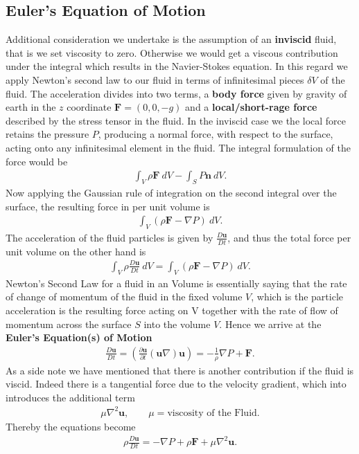 \subsection{Euler's Equation of Motion}
Additional consideration we undertake is the assumption of an
\textbf{inviscid} fluid, that is we set viscosity to zero. Otherwise we would
get a viscous contribution under the integral which results in the
Navier-Stokes equation. In this regard we apply Newton's second law to our
fluid in terms of infinitesimal pieces $\delta V$ of the fluid. The
acceleration divides into two terms, a \textbf{body force} given by gravity
of earth in the $z$ coordinate $\mathbf{F} = (0, 0, -g)$ and a
\textbf{local/short-rage force} described by the stress tensor in the fluid.
In the inviscid case we the local force retains the pressure $P$, producing a
normal force, with respect to the surface, acting onto any infinitesimal
element in the fluid. The integral formulation of the force would be
\begin{align}
    \int_V \rho \mathbf{F}\ dV - \int_S P\mathbf{n}\ dV.
\end{align}
Now applying the Gaussian rule of integration on the second integral over the
surface, the resulting force in per unit volume is
\begin{align}
    \int_V \left(\rho \mathbf{F} - \nabla P\right)\ dV.
\end{align}
The acceleration of the fluid particles is given by $\frac{D\mathbf{u}}{Dt}$,
and thus the total force per unit volume on the other hand is
\begin{align}
    \int_V \rho \frac{D\mathbf{u}}{Dt}\ dV =
    \int_V \left(\rho \mathbf{F} - \nabla P\right)\ dV.
\end{align}
Newton's Second Law for a fluid in an Volume is essentially saying that the
rate of change of momentum of the fluid in the fixed volume $V$, which is the particle
acceleration is the resulting force acting on V together with the rate of
flow of momentum across the surface $S$ into the volume $V$. Hence we arrive
at the \textbf{Euler's Equation(s) of Motion}
\begin{align}
    \frac{D\mathbf{u}}{Dt} = \left(\frac{\partial \mathbf{u}}{\partial t}
    (\mathbf{u}\nabla)\mathbf{u}\right)  =
    -\frac{1}{\rho}\nabla P + \mathbf{F}.
\end{align}
As a side note we have mentioned that there is another contribution if the
fluid is viscid. Indeed there is a tangential force due to the velocity
gradient, which into introduces the additional term
\begin{align}
    \mu \nabla^2 \mathbf{u}, \qquad
    \mu = \text{viscosity of the Fluid}.
\end{align}
Thereby the equations become
\begin{align}
    \rho\frac{D\mathbf{u}}{Dt}
    =  -\nabla P + \rho \mathbf{F} + \mu \nabla^2 \mathbf{u}.
\end{align}

